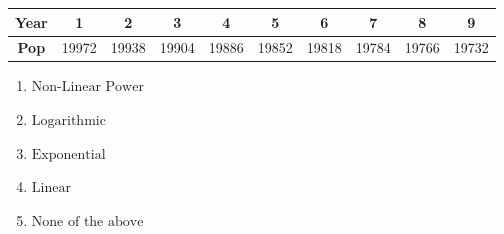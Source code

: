 \documentclass[14pt]{extbook}
\begin{document}
\begin{enumerate}
{\begin{tabular}{c|c|c|c|c|c|c|c|c|c}
\textbf{Year} &1 &2 &3 &4 &5 &6 &7 &8 &9\tabularnewline \hline
\textbf{Pop} &19972 &19938 &19904 &19886 &19852 &19818 &19784 &19766 &19732\end{tabular}\begin{enumerate}[label=\Alph*.]
\item \( \text{Non-Linear Power} \)
\item \( \text{Logarithmic} \)
\item \( \text{Exponential} \)
\item \( \text{Linear} \)
\item \( \text{None of the above} \)

\end{enumerate} }
\end{enumerate}
\end{document}
